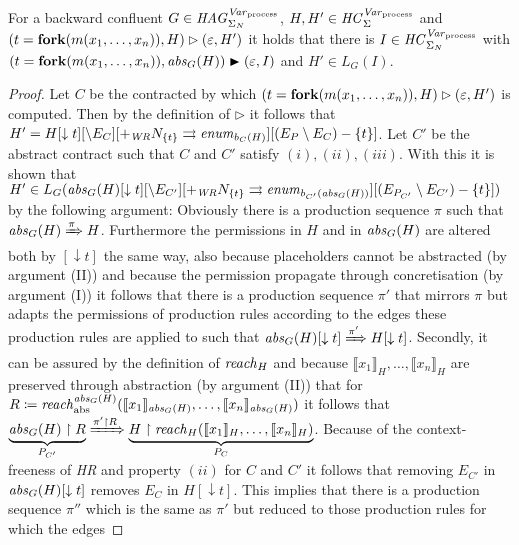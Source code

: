 	\begin{lemma}
		For a backward confluent $G\in\mathit{HAG}_{\Sigma_{N}}^{\mathit{Var}_{\text{process}}}$, $H,H'\in\mathit{HC}_{\Sigma}^{\mathit{Var}_{\text{process}}}$ and
		$(t=\text{\textbf{fork}}(m(x_{1},\dots,x_{n})),H)\rhd(\varepsilon, H')$
		it holds that there is $I\in\mathit{HC}_{\Sigma_{N}}^{\mathit{Var}_{\text{process}}}$ with
		$(t=\text{\textbf{fork}}(m(x_1,\dots,x_n)),\mathit{abs}_{G}(H))
			\blacktriangleright(\varepsilon,I)$ and $H'\in L_{G}(I)$.
	\end{lemma}
	\begin{proof}
		Let $C$ be the contracted by which
		$(t=\text{\textbf{fork}}(m(x_{1},\dots,x_{n})),H)\rhd(\varepsilon, H')$
		is computed. Then by the definition of $\rhd$ it follows that
		$H' = H[\downarrow t][\setminus E_{C}]
		[+_{\mathit{WR}}N_{\{t\}}\rightrightarrows
		\mathit{enum}_{b_{C}(H)}][(E_{P}\setminus E_{C})-\{t\}]$. Let $C'$ be the
		abstract contract such that $C$ and $C'$ satisfy $(i), (ii), (iii)$.
		With this it is shown that $H'\in L_{G}(\mathit{abs}_{G}(H)[\downarrow t]
		[\setminus E_{C'}][+_\mathit{WR}N_{\{t\}}
		\rightrightarrows \mathit{enum}_{b_{C'}(\mathit{abs}_{G}(H))}]
		[(E_{P_{C'}}\setminus E_{C'}) - \{t\}])$ by the following argument:
		Obviously there is a production sequence $\pi$ such that
		$\mathit{abs}_{G}(H)\xRightarrow{\pi}H$. Furthermore the permissions in $H$ and
		in $\mathit{abs}_{G}(H)$ are altered both by $[\downarrow t]$ the same way, also
		because placeholders cannot be abstracted (by argument (II)) and because
		the permission propagate through concretisation (by argument (I)) it
		follows that there is a production sequence $\pi'$ that mirrors $\pi$ but
		adapts the permissions of production rules according to the edges these
		production rules are applied to such that $\mathit{abs}_{G}(H)[\downarrow t]
		\xRightarrow{\pi'}H[\downarrow t]$. Secondly, it can be assured by the
		definition of
		$\mathit{reach}_{H}$ and because $\llbracket x_1\rrbracket_H,\dots,
		\llbracket x_n\rrbracket_H$ are preserved through abstraction
		(by argument (II)) that for $R\coloneqq \mathit{reach}_{\text{abs}}^{\mathit{abs}_{G}(H)}
		(\llbracket x_1
		\rrbracket_{\mathit{abs}_{G}(H)}, \dots,\llbracket x_n\rrbracket_{\mathit{abs}_G(H)})$
		it follows that $\underbrace{\mathit{abs}_{G}(H)\upharpoonright R}_{P_{C'}}
		\xRightarrow{\pi'\upharpoonright R} \underbrace{H\upharpoonright
		\mathit{reach}_{H}(\llbracket x_1\rrbracket_H,\dots,\llbracket x_n\rrbracket_H)}_
		{P_C}$. Because of the context-freeness of \emph{\ac{HR}} and property
		$(ii)$ for $C$ and $C'$ it follows that removing $E_{C'}$ in
		$\mathit{abs}_{G}(H)[\downarrow t]$ removes $E_{C}$ in $H[\downarrow t]$.
		This implies that there is a production sequence $\pi''$ which is the
		same as $\pi'$ but reduced to those production rules for which the edges

\end{proof}
